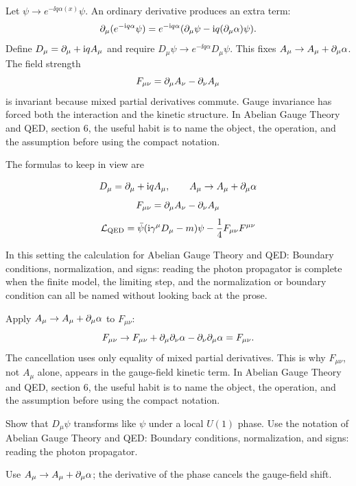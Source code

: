 Let \(\psi\to e^{-\ii q\alpha(x)}\psi\).  An ordinary derivative produces an extra term:
\[
  \partial_\mu(e^{-\mathrm i q\alpha}\psi)
  =
  e^{-\mathrm i q\alpha}(\partial_\mu\psi-\mathrm i q(\partial_\mu\alpha)\psi).
\]
Define \(D_\mu=\partial_\mu+\mathrm i qA_\mu\) and require \(D_\mu\psi\to e^{-\ii q\alpha}D_\mu\psi\).  This fixes \(A_\mu\to A_\mu+\partial_\mu\alpha\).  The field strength
\[
  F_{\mu\nu}=\partial_\mu A_\nu-\partial_\nu A_\mu
\]
is invariant because mixed partial derivatives commute.  Gauge invariance has forced both the interaction and the kinetic structure.  In Abelian Gauge Theory and QED, section 6, the useful habit is to name the object, the operation, and the assumption before using the compact notation.

The formulas to keep in view are

\[
  D_\mu=\partial_\mu+\mathrm i qA_\mu,\qquad A_\mu\to A_\mu+\partial_\mu\alpha
\]
\[
  F_{\mu\nu}=\partial_\mu A_\nu-\partial_\nu A_\mu
\]
\[
  \mathcal L_{\mathrm{QED}}=\bar\psi(\mathrm i\gamma^\mu D_\mu-m)\psi-\frac14F_{\mu\nu}F^{\mu\nu}
\]

In this setting the calculation for Abelian Gauge Theory and QED: Boundary conditions, normalization, and signs: reading the photon propagator is complete when the finite model, the limiting step, and the normalization or boundary condition can all be named without looking back at the prose.




\begin{example}
Apply \(A_\mu\to A_\mu+\partial_\mu\alpha\) to \(F_{\mu\nu}\):
\[
  F_{\mu\nu}\to F_{\mu\nu}+\partial_\mu\partial_\nu\alpha-\partial_\nu\partial_\mu\alpha=F_{\mu\nu}.
\]
The cancellation uses only equality of mixed partial derivatives.  This is why \(F_{\mu\nu}\), not \(A_\mu\) alone, appears in the gauge-field kinetic term.  In Abelian Gauge Theory and QED, section 6, the useful habit is to name the object, the operation, and the assumption before using the compact notation.
\end{example}



\begin{exercise}
Show that \(D_\mu\psi\) transforms like \(\psi\) under a local \(U(1)\) phase.  Use the notation of Abelian Gauge Theory and QED: Boundary conditions, normalization, and signs: reading the photon propagator.
\begin{answer}
Use \(A_\mu\to A_\mu+\partial_\mu\alpha\); the derivative of the phase cancels the gauge-field shift.
\end{answer}
\end{exercise}

